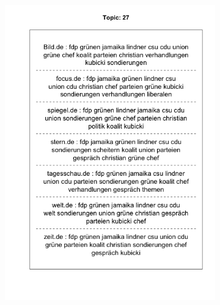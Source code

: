 \documentclass[12pt,a4paper,notitlepage]{article}
\begin{document}
\begin{figure}[H]
\begin{center}
\begin{subfigure}[normla]{0.49\textwidth}
			\includegraphics[width=\textwidth]{figs/plotquote27.png}
		\end{subfigure}
	\end{center}
\end{figure}
\end{document}

